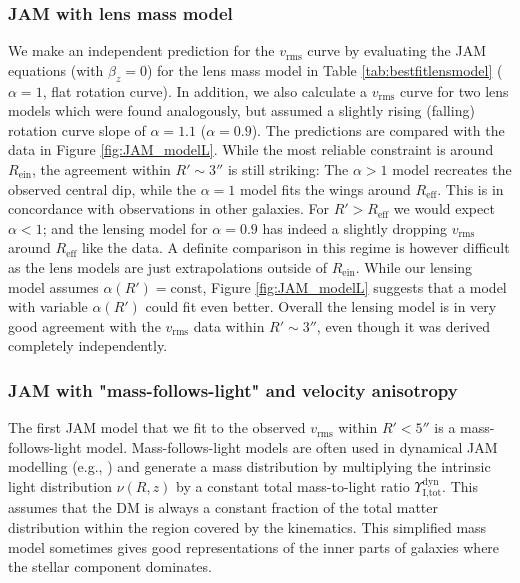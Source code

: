 \documentclass[useAMS,usenatbib]{mnras}
\begin{document}
\subsubsection{JAM with lens mass model}

We make an independent prediction for the $v_\text{rms}$ curve by evaluating the JAM equations (with $\beta_z = 0$) for the lens mass model in Table \ref{tab:bestfitlensmodel} ($\alpha = 1$, flat rotation curve). In addition, we also calculate a  $v_\text{rms}$ curve for two lens models which were found analogously, but assumed a slightly rising (falling) rotation curve slope of $\alpha=1.1$ ($\alpha=0.9$). The predictions are compared with the data in Figure \ref{fig:JAM_modelL}. While the most reliable constraint is around $R_\text{ein}$, the agreement within $R' \sim 3''$ is still striking: The $\alpha > 1$ model recreates the observed central dip, while the $\alpha = 1$ model fits the wings around $R_\text{eff}$. This is in concordance with observations in other galaxies. For $R'> R_\text{eff}$ we would expect $\alpha<1$; and the lensing model for $\alpha=0.9$ has indeed a slightly dropping $v_\text{rms}$ around $R_\text{eff}$ like the data. A definite comparison in this regime is however difficult as the lens models are just extrapolations outside of $R_\text{ein}$. While our lensing model assumes $\alpha(R')=\text{const}$, Figure \ref{fig:JAM_modelL} suggests that a model with variable $\alpha(R')$ could fit even better. Overall the lensing model is in very good agreement with the $v_\text{rms}$ data within $R' \sim 3''$, even though it was derived completely independently.

\subsubsection{JAM with "mass-follows-light" and velocity anisotropy} \label{sec:results_JAM_SB_MfL}

The first JAM model that we fit to the observed $v_\text{rms}$ within $R'<5''$ is a mass-follows-light model. Mass-follows-light models are often used in dynamical JAM modelling (e.g., \citealt{GlennEC,Cap06}) and generate a mass distribution by multiplying the intrinsic light distribution $\nu(R,z)$ by a constant total mass-to-light ratio  $\Upsilon_\text{I,tot}^\text{dyn}$. This assumes that the DM is always a constant fraction of the total matter distribution within the region covered by the kinematics. This simplified mass model sometimes gives good representations of the inner parts of galaxies where the stellar component dominates.
\end{document}
